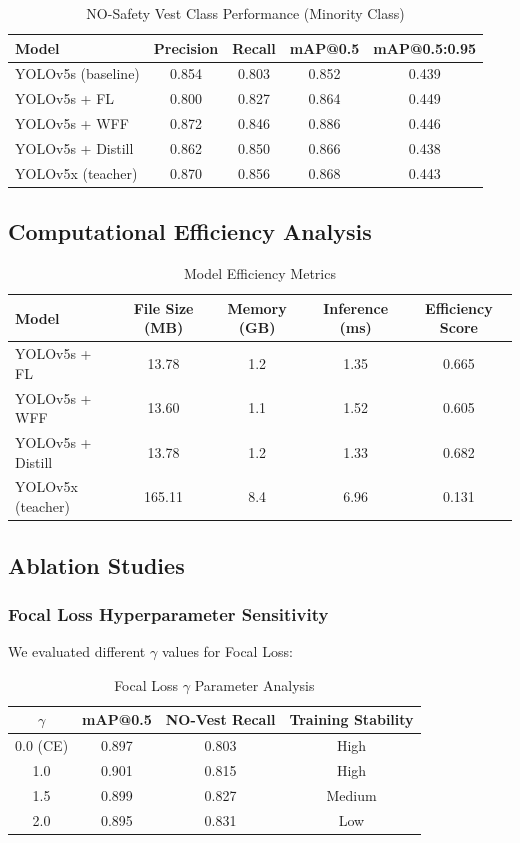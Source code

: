 \documentclass[journal]{IEEEtran}
\begin{document}
\begin{table}[h]
\centering
\caption{NO-Safety Vest Class Performance (Minority Class)}
\begin{tabular}{|l|c|c|c|c|}
\hline
Model & Precision & Recall & mAP@0.5 & mAP@0.5:0.95 \\
\hline
YOLOv5s (baseline) & 0.854 & 0.803 & 0.852 & 0.439 \\
YOLOv5s + FL & 0.800 & 0.827 & 0.864 & 0.449 \\
YOLOv5s + WFF & 0.872 & 0.846 & 0.886 & 0.446 \\
YOLOv5s + Distill & 0.862 & 0.850 & 0.866 & 0.438 \\
YOLOv5x (teacher) & 0.870 & 0.856 & 0.868 & 0.443 \\
\hline
\end{tabular}
\end{table}

\subsection{Computational Efficiency Analysis}

\begin{table}[h]
\centering
\caption{Model Efficiency Metrics}
\begin{tabular}{|l|c|c|c|c|}
\hline
Model & File Size (MB) & Memory (GB) & Inference (ms) & Efficiency Score \\
\hline
YOLOv5s + FL & 13.78 & 1.2 & 1.35 & 0.665 \\
YOLOv5s + WFF & 13.60 & 1.1 & 1.52 & 0.605 \\
YOLOv5s + Distill & 13.78 & 1.2 & 1.33 & 0.682 \\
YOLOv5x (teacher) & 165.11 & 8.4 & 6.96 & 0.131 \\
\hline
\end{tabular}
\end{table}

\subsection{Ablation Studies}

\subsubsection{Focal Loss Hyperparameter Sensitivity}

We evaluated different $\gamma$ values for Focal Loss:

\begin{table}[h]
\centering
\caption{Focal Loss $\gamma$ Parameter Analysis}
\begin{tabular}{|c|c|c|c|}
\hline
$\gamma$ & mAP@0.5 & NO-Vest Recall & Training Stability \\
\hline
0.0 (CE) & 0.897 & 0.803 & High \\
1.0 & 0.901 & 0.815 & High \\
1.5 & 0.899 & 0.827 & Medium \\
2.0 & 0.895 & 0.831 & Low \\
\hline
\end{tabular}
\end{table}
\end{document}
